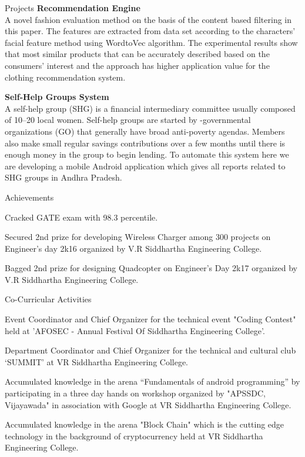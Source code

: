 \documentclass{CV_Chinnapareddy_2220570}
\begin{document}
\begin{rSection}{Projects}
{\bf Recommendation Engine}
\\A novel fashion evaluation method on the basis of the content based filtering in this
paper. The features are extracted from data set according to the characters’ facial feature
method using WordtoVec algorithm. The experimental results show that most similar products that can be accurately described based on the consumers’ interest and the approach has higher application value for the clothing recommendation system.

{\bf Self-Help Groups System}
\\A self-help group (SHG) is a financial intermediary committee usually
composed of 10–20 local women. Self-help groups are started by -governmental
organizations (GO) that generally have broad anti-poverty agendas. Members also make
small regular savings contributions over a few months until there is enough money in the
group to begin lending. To automate this system here we are developing a mobile Android
application which gives all reports related to SHG groups in Andhra Pradesh.

\end{rSection}

\begin{achSection}{Achievements} 
\item Cracked GATE exam with 98.3 percentile.
\item Secured 2nd prize for developing Wireless Charger among 300 projects on Engineer's day 2k16 organized by V.R Siddhartha Engineering College.
\item Bagged 2nd prize for designing Quadcopter on Engineer's Day 2k17 organized by V.R Siddhartha Engineering College.
\end{achSection}


\begin{achSection}{Co-Curricular Activities} 

\item Event Coordinator and Chief Organizer for the technical event "Coding Contest"
held at 'AFOSEC - Annual Festival Of Siddhartha Engineering College'.

\item Department Coordinator and Chief Organizer for the technical and cultural club
‘SUMMIT’ at VR Siddhartha Engineering College.

\item Accumulated knowledge in the arena “Fundamentals of android programming” by
participating in a three day hands on workshop organized by "APSSDC,
Vijayawada" in association with Google at VR Siddhartha Engineering College.

\item Accumulated knowledge in the arena "Block Chain" which is the cutting edge
technology in the background of cryptocurrency held at VR Siddhartha
Engineering College.

\end{achSection}
\end{document}

